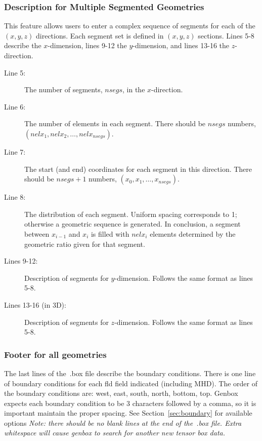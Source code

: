 \subsubsection{Description for Multiple Segmented Geometries}

This feature allows users to enter a complex sequence of segments for each of
the \((x,y,z)\) directions. Each segment set is defined in \((x,y,z)\) sections.
Lines 5-8 describe the \(x\)-dimension, lines 9-12 the \(y\)-dimension,
and lines 13-16 the \(z\)-direction.

\begin{description}

  \item[Line 5:] The number of segments, \(nsegs\), in the \(x\)-direction.

  \item[Line 6:] The number of elements in each segment. There should be \(nsegs\)
    numbers, \\
    \((nelx_1, nelx_2, \ldots, nelx_{nsegs})\).

  \item[Line 7:] The start (and end) coordinates for each segment in this
    direction.  There should be \(nsegs+1\) numbers, \((x_0, x_1, \ldots,
    x_{nsegs})\).

  \item[Line 8:] The distribution of each segment. Uniform spacing corresponds
    to 1; otherwise a geometric sequence is generated.  In conclusion, a
    segment between \(x_{i-1}\) and \(x_i\) is filled with \(nelx_i\) elements
    determined by the geometric ratio given for that segment.

  \item[Lines 9-12:] Description of segments for \(y\)-dimension.  Follows the
    same format as lines 5-8.

  \item[Lines 13-16 (in 3D):] Description of segments for \(z\)-dimension.
    Follows the same format as lines 5-8.

\end{description}

\subsubsection{Footer for all geometries}

The last lines of the~.box file describe the boundary conditions.  There is one
line of boundary conditions for each fld field indicated (including MHD).  The
order of the boundary conditions are: west, east, south, north, bottom, top.
Genbox expects each boundary condition to be 3 characters followed by a comma,
so it is important maintain the proper spacing.  See Section~\ref{sec:boundary}
for available options {\em Note: there should be no blank lines at the end
  of the~.box file.  Extra whitespace will cause genbox to search for another
new tensor box data.}


